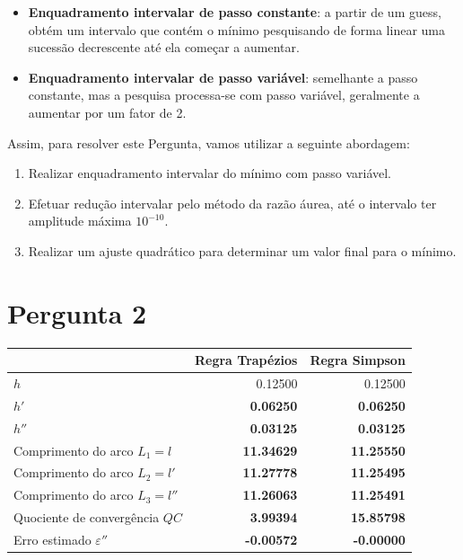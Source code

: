 {\begin{itemize}
    \item \textbf{Enquadramento intervalar de passo constante}: a partir de um guess, obtém um intervalo que contém o mínimo pesquisando de forma linear uma sucessão decrescente até ela começar a aumentar.
    \item \textbf{Enquadramento intervalar de passo variável}: semelhante a passo constante, mas a pesquisa processa-se com passo variável, geralmente a aumentar por um fator de 2.
\end{itemize}
Assim, para resolver este Pergunta, vamos utilizar a seguinte abordagem:
\begin{enumerate}
    \item Realizar enquadramento intervalar do mínimo com passo variável.
    \item Efetuar redução intervalar pelo método da razão áurea, até o intervalo ter amplitude máxima $10^{-10}$.
    \item Realizar um ajuste quadrático para determinar um valor final para o mínimo.
\end{enumerate}


\section{Pergunta 2}


\begin{center} \begin{tabular}{l | r | r}
    & Regra Trapézios & Regra Simpson \\ \hline
    $h  $ & 0.12500 & 0.12500 \\
    $h' $ & \textbf{0.06250} & \textbf{0.06250} \\
    $h''$ & \textbf{0.03125} & \textbf{0.03125} \\
    Comprimento do arco $L_1=l  $ & \textbf{11.34629} & \textbf{11.25550} \\
    Comprimento do arco $L_2=l' $ & \textbf{11.27778} & \textbf{11.25495} \\
    Comprimento do arco $L_3=l''$ & \textbf{11.26063} & \textbf{11.25491} \\
    Quociente de convergência $QC$ & \textbf{3.99394} & \textbf{15.85798} \\
    Erro estimado $\varepsilon''$ & \textbf{-0.00572} & \textbf{-0.00000}
\end{tabular} \end{center}

}
